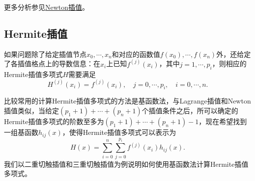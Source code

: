 \documentclass[a4paper,10pt]{ctexart}
\begin{document}
更多分析参见\href{http://staff.ustc.edu.cn/~rui/ppt/num/num-interpolation-newton.html}{Newton插值}。

\subsection{Hermite插值}
如果问题除了给定插值节点$ x_0,\cdots ,x_n $和对应的函数值$ f(x_0),\cdots ,f(x_n) $外，还给定了各插值格点上的导数信息：在$ x_i $上已知$ f^{(j)}(x_i) $，其中$ j=1,\cdots ,p_i $，则相应的Hermite插值多项式$ H $需要满足
\begin{equation}
    H^{(j)}(x_i) = f^{(j)}(x_i),\quad j=0,\cdots ,p_i,\quad i=0,\cdots ,n.
\end{equation}

比较常用的计算Hermite插值多项式的方法是基函数法，与Lagrange插值和Newton插值类似，当给定$ (p_1+1)+\cdots +(p_n+1) $个插值条件之后，所可以确定的Hermite插值多项式的阶数至多为$ (p_1+1)+\cdots +(p_n+1)-1 $，现在希望找到一组基函数$ h_{ij}(x) $，使得Hermite插值多项式可以表示为
\begin{equation}
    H(x)= \sum_{i=0}^{n} \sum_{j=0}^{p_i}f^{(j)}(x_i) h_{ij}(x).
\end{equation}
我们以二重切触插值和三重切触插值为例说明如何使用基函数法计算Hermite插值多项式。
\end{document}
